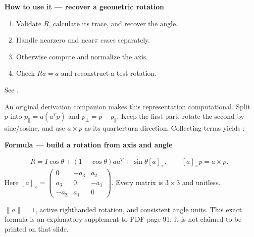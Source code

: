 \documentclass[letterpaper,11pt,english,openany,oneside]{jupyterBook}
\begin{document}
\begin{TextbookBox}
\textbf{How to use it — recover a geometric rotation}\par\smallskip
\begin{enumerate}
%
\item {}
\sphinxAtStartPar
Validate \(R\), calculate its trace, and recover the angle.

\item {}
\sphinxAtStartPar
Handle near\sphinxhyphen{}zero and near\sphinxhyphen{}\(\pi\) cases separately.

\item {}
\sphinxAtStartPar
Otherwise compute and normalize the axis.

\item {}
\sphinxAtStartPar
Check \(Ra=a\) and reconstruct a test rotation.

\end{enumerate}

\sphinxAtStartPar
See {\hyperref[\detokenize{lectures/lecture01/rotations:ex-lec01-quaternion}]{}}.

\end{TextbookBox}

\sphinxAtStartPar
An original derivation companion makes this representation computational. Split \(p\) into \(p_\parallel=a(a^Tp)\) and \(p_\perp=p-p_\parallel\). Keep the first part, rotate the second by sine/cosine, and use \(a\times p\) as its quarter\sphinxhyphen{}turn direction. Collecting terms yields :

\begin{TextbookBox}
\textbf{Formula — build a rotation from axis and angle}\par\smallskip
\begin{equation}\label{equation:lectures/lecture01/rotations:eq-lec01-rodrigues}
\begin{split}R=I\cos\theta+(1-\cos\theta)aa^T+\sin\theta[a]_\times,
\qquad [a]_\times p=a\times p.\end{split}
\end{equation}
\sphinxAtStartPar
Here \([a]_\times=\begin{pmatrix}0&-a_3&a_2\\a_3&0&-a_1\\-a_2&a_1&0\end{pmatrix}\). Every matrix is \(3\times3\) and unitless.

\sphinxAtStartPar
{} \(\|a\|=1\), active right\sphinxhyphen{}handed rotation, and consistent angle units. This exact formula is an explanatory supplement to PDF page 91; it is not claimed to be printed on that slide.

\end{TextbookBox}
\end{document}

